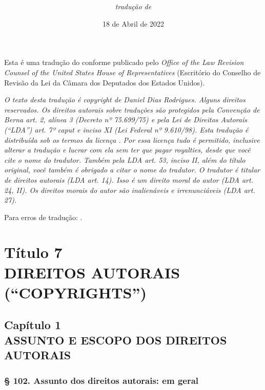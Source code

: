 \documentclass[a5paper,10pt]{book}
\title{\textbf{\titulo}}
\author{\textit{tradução de}\\\autor}
\date{18 de Abril de 2022}
\newcommand{\sublinhado}[1]{\underline{\smash{#1}}}
\begin{document}
\maketitle

Esta é uma tradução do \href{https://uscode.house.gov}{\sublinhado{United States Code}} conforme publicado pelo \textit{Office of the Law Revision Counsel of the United States House of Representatives} (Escritório do Conselho de Revisão da Lei da Câmara dos Deputados dos Estados Unidos).

\textit{O texto desta tradução é copyright  de Daniel Dias Rodrigues. Alguns direitos reservados. Os direitos autorais sobre traduções são protegidos pela Convenção de Berna art. 2, alínea 3 (Decreto nº 75.699/75) e pela Lei de Direitos Autorais (``LDA'') art. 7º caput e inciso XI (Lei Federal nº 9.610/98). Esta tradução é distribuída sob os termos da licença \href{https://creativecommons.org/licenses/by/4.0/deed.pt_BR}{\underline{}}. Por essa licença tudo é permitido, inclusive alterar a tradução e lucrar com ela sem ter que pagar royalties, desde que você cite o nome do tradutor. Também pela LDA art. 53, inciso II, além do título original, você também é obrigado a citar o nome do tradutor. O tradutor é titular de direitos autorais (LDA art. 14). Isso é um direito moral do autor (LDA art. 24, II). Os direitos morais do autor são inalienáveis e irrenunciáveis (LDA art. 27).}

Para erros de tradução: \href{mailto:danieldiasr@gmail.com}{\underline{}}.

\tableofcontents

\part[TÍT. 7 -- DIREITOS AUTORAIS (``COPYRIGHTS'')]{Título 7\\ DIREITOS AUTORAIS (``COPYRIGHTS'')}

\chapter[Cap. 1 -- ASSUNTO E ESCOPO DOS DIREITOS AUTORAIS]{Capítulo 1\\ ASSUNTO E ESCOPO DOS DIREITOS AUTORAIS}

\section{§ 102. Assunto dos direitos autorais: em geral}
\end{document}
